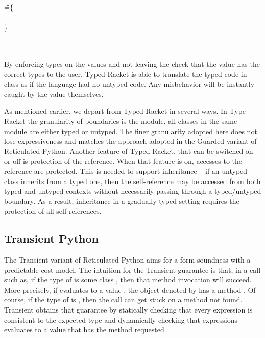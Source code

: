 \documentclass[acmlarge, anonymous, authordraft, review]{acmart} %
\begin{document}

\medskip
\begin{tabbing}
\HS\HS \KCall{\New\A{}}\m{\BehCast\any{\New\C{}}}\any\any \HS\WHERE\HS\K\HS=\HS\=
\class\= \A \{\\
\>\> \Mdef\m\x\any\any{ ~ \BehCast\any{\KCall{\New\D{}}\m{\BehCast\D\x}{\C}\D~}} \\
\>\}\\
 \>  \Class\D{}{\Mdef\m\x\D\D{\KCall\x\m\x\D\D}} \\
 \>  \Class{\C}{}{\Mdef\m\x{\any}{\any}{\x}} \\
\end{tabbing}
\medskip


\noindent By enforcing types on the values and not leaving the check that
the value has the correct types to the user. Typed Racket is able to
translate the typed code in class \D as if the language had no untyped
code. Any misbehavior will be instantly caught by the value themselves.

As mentioned earlier, we depart from Typed Racket in several ways. In Type
Racket the granularity of boundaries is the module, all classes in the same
module are either typed or untyped.  The finer granularity adopted here does
not lose expressiveness and matches the approach adopted in the Guarded
variant of Reticulated Python. Another feature of Typed Racket, that can be
switched on or off is protection of the \this reference. When that feature
is on, accesses to the \this reference are protected. This is needed to
support inheritance -- if an untyped class inherits from a typed one, then
the self-reference may be accessed from both typed and untyped contexts
without necessarily passing through a typed/untyped boundary. As a result,
inheritance in a gradually typed setting requires the protection of all
self-references.


\subsection{Transient Python}

The Transient variant of Reticulated Python aims for a form soundness with a
predictable cost model. The intuition for the Transient guarantee is that,
in a call such as\Call\e\m\ep, if the type of \e is some class \C, then that
method invocation will succeed. More precisely, if \e evaluates to a value
\a, the object denoted by \a has a method \m. Of course, if the type of \e is
\any, then the call can get stuck on a method not found. Transient obtains
that guarantee by statically checking that every expression is consistent to
the expected type and dynamically checking that expressions evaluates to a
value that has the method requested.
\end{document}
